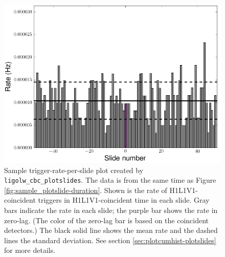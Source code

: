 \begin{figure}[p]
\label{fig:sample_plotslide-rate}
\center
\includegraphics[width=5in]{figures/H1L1V1-ligolw_cbc_plotslides_FULL_DATA_CAT_4_VETO_H1L1V1_rates_ALL_DATA_PLOTTED_OPEN_BOX-931035296-4763191.png}
\caption{Sample trigger-rate-per-slide plot created by
\texttt{ligolw\_cbc\_plotslides}. The data is from the same time as Figure
\ref{fig:sample_plotslide-duration}. Shown is the rate of H1L1V1-coincident
triggers in H1L1V1-coincident time in each slide. Gray bars indicate the rate
in each slide; the purple bar shows the rate in zero-lag. (The color of the
zero-lag bar is based on the coincident detectors.) The black solid line shows
the mean rate and the dashed lines the standard deviation.  See section
\ref{sec:plotcumhist-plotslides} for more details.}
\end{figure}

